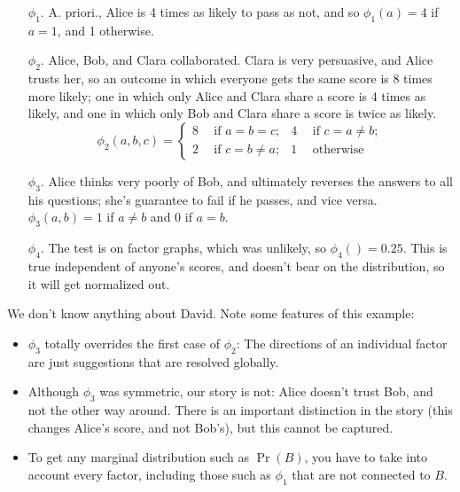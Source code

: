 \documentclass{article}
\numberwithin{equation}{section}
\begin{document}
\begin{notfocus}
\begin{example}
		
		\begin{enumerate}[nosep]
			\item[$\phi_1$.] A. priori., Alice is 4 times as likely to pass as not, and so $\phi_1(a) = 4$ if $a = 1$, and 1 otherwise.
			\item[$\phi_2$.] Alice, Bob, and Clara collaborated. Clara is very persuasive, and Alice trusts her, so an outcome in which everyone gets the same score is 8 times more likely; one in which only Alice and Clara share a score is 4 times as likely, and one in which only Bob and Clara share a score is twice as likely.
			\[ \phi_2(a,b,c) = \left\{\begin{aligned}
				8 &~~ \text{if~} a = b = c; &
				4 &~~ \text{if~}c = a \neq b; \\
				2 &~~ \text{if~}c = b \neq a; &
				1 &~~ \text{otherwise}
			\end{aligned}\right. \]
			\item[$\phi_3$.] Alice thinks very poorly of Bob, and ultimately reverses the answers to all his questions; she's guarantee to fail if he passes, and vice versa. $\phi_3(a,b) = 1$ if $a \neq b$ and 0 if $a=b$.
			\item[$\phi_4$.] The test is on factor graphs, which was unlikely, so $\phi_4() = 0.25$. This is true independent of anyone's scores, and doesn't bear on the distribution, so it will get normalized out.
		\end{enumerate}
		We don't know anything about David. 
		Note some features of this example:
		\begin{itemize}[nosep]
			\item $\phi_3$ totally overrides the first case of $\phi_2$: The directions of an individual factor are just suggestions that are resolved globally.
			\item Although $\phi_3$ was symmetric, our story is not: Alice doesn't trust Bob, and not the other way around. There is an important distinction in the story (this changes Alice's score, and not Bob's), but this cannot be captured.
			\item To get any marginal distribution such as $\Pr(B)$, you have to take into account every factor, including those such as $\phi_1$ that are not connected to $B$.

\end{itemize}
\end{example}
\end{notfocus}
\end{document}
